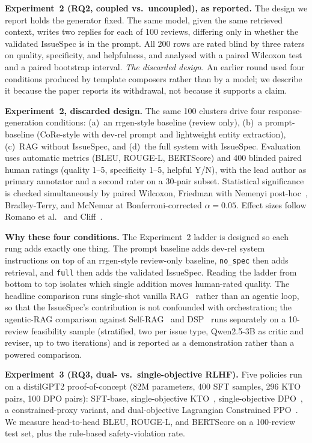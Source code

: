\documentclass[preprint,12pt]{elsarticle}
\begin{document}
\textbf{Experiment~2 (RQ2, coupled vs.\ uncoupled), as reported.} The design we report holds the
generator fixed. The same model, given the same retrieved context, writes two replies for each of
100 reviews, differing only in whether the validated IssueSpec is in the prompt. All 200 rows are
rated blind by three raters on quality, specificity, and helpfulness, and analysed with a paired
Wilcoxon test and a paired bootstrap interval. \emph{The discarded design.} An earlier round used
four conditions produced by template composers rather than by a model; we describe it because the
paper reports its withdrawal, not because it supports a claim.

\textbf{Experiment~2, discarded design.} The same 100 clusters drive four response-generation conditions: (a)~an rrgen-style baseline (review only), (b)~a prompt-baseline (CoRe-style with dev-rel prompt and lightweight entity extraction), (c)~RAG without IssueSpec, and (d)~the full system with IssueSpec. Evaluation uses automatic metrics (BLEU, ROUGE-L, BERTScore) and 400 blinded paired human ratings (quality 1--5, specificity 1--5, helpful Y/N), with the lead author as primary annotator and a second rater on a 30-pair subset. Statistical significance is checked simultaneously by paired Wilcoxon, Friedman with Nemenyi post-hoc~\cite{demvsar2006statistical}, Bradley-Terry, and McNemar at Bonferroni-corrected $\alpha = 0.05$. Effect sizes follow Romano et al.~\cite{romano2006appropriate} and Cliff~\cite{cliff1993dominance}.

\textbf{Why these four conditions.} The Experiment~2 ladder is designed so each rung adds
exactly one thing. The prompt baseline adds dev-rel system instructions on top of an rrgen-style
review-only baseline, \texttt{no\_spec} then adds retrieval, and \texttt{full} then adds the
validated IssueSpec. Reading the ladder from bottom to top isolates which single addition moves
human-rated quality. The headline comparison runs single-shot vanilla RAG~\cite{lewis2020retrieval}
rather than an agentic loop, so that the IssueSpec's contribution is not confounded with
orchestration; the agentic-RAG comparison against Self-RAG~\cite{asai2024self} and
DSP~\cite{khattab2022demonstrate} runs separately on a 10-review feasibility sample (stratified,
two per issue type, Qwen2.5-3B as critic and reviser, up to two iterations) and is reported as a
demonstration rather than a powered comparison.

\textbf{Experiment~3 (RQ3, dual- vs.\ single-objective RLHF).} Five policies run on a
  distilGPT2 proof-of-concept (82M parameters, 400 SFT samples, 296 KTO pairs, 100 DPO pairs):
  SFT-base, single-objective KTO~\cite{ethayarajh2024kto}, single-objective
  DPO~\cite{rafailov2023direct}, a constrained-proxy variant, and dual-objective Lagrangian
  Constrained PPO~\cite{schulman2017proximal, dai2024safe}. We measure head-to-head BLEU, ROUGE-L, and
  BERTScore on a 100-review test set, plus the rule-based safety-violation rate.
\end{document}
